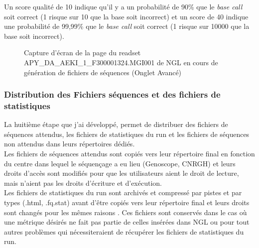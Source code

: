 Un score qualité de 10 indique qu'il y a un probabilité de 90\% que le \emph{base call} soit correct (1 risque sur 10 que la base soit incorrect) et un score de 40 indique une probabilité de 99,99\% que le \emph{base call} soit correct (1 risque sur 10000 que la base soit incorrect).\\

\begin{figure}[H]
    \centering
    \caption{\footnotesize{Capture d'écran de la page du readset APY\_DA\_AEKI\_1\_F300001324.MGI001 de NGL en cours de génération de fichiers de séquences (Onglet \og Avancé\fg{})}}
    \label{meta-data-fastq}
\end{figure}

\subsubsection*{Distribution des Fichiers séquences et des fichiers de statistiques}
La huitième étape que j'ai développé, permet de distribuer des fichiers de séquences \og attendus\fg{}, les fichiers de statistiques du run et les fichiers de séquences \og non attendus\fg{} dans leurs répertoires dédiés.\\

Les fichiers de séquences \og attendus\fg{} sont copiés vers leur répertoire final en fonction du centre dans lequel le séquençage a eu lieu (Genoscope, CNRGH) et leurs droits d'accès sont modifiés pour que les utilisateurs aient le droit de lecture, mais n'aient pas les droits d'écriture et d'exécution.\\

Les fichiers de statistiques du run sont archivés et compressé par pistes et par types (.html, .fq.stat) avant d'être copiés vers leur répertoire final et leurs droits sont changés pour les mêmes raisons .
Ces fichiers sont conservés dans le cas où une métrique désirés ne fait pas partie de celles insérées dans NGL ou pour tout autres problèmes qui nécessiteraient de récupérer les fichiers de statistiques du run.\\

